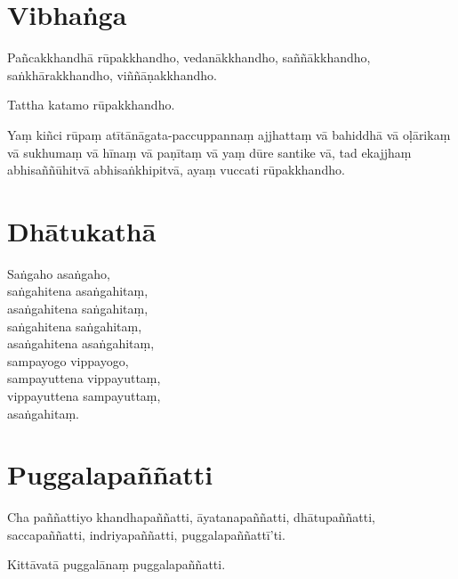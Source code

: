 


\section{Vibhaṅga}

Pañcakkhandhā rūpakkhandho, vedanākkhandho, saññākkhandho, saṅkhārakkhandho,
viññāṇakkhandho.

Tattha katamo rūpakkhandho.

Yaṃ kiñci rūpaṃ atītānāgata-paccuppannaṃ ajjhattaṃ vā bahiddhā vā oḷārikaṃ vā
sukhumaṃ vā hīnaṃ vā paṇītaṃ vā yaṃ dūre santike vā, tad ekajjhaṃ
abhisaññūhitvā abhisaṅkhipitvā, ayaṃ vuccati rūpakkhandho.



\section{Dhātukathā}

Saṅgaho asaṅgaho,\\
saṅgahitena asaṅgahitaṃ,\\
asaṅgahitena saṅgahitaṃ,\\
saṅgahitena saṅgahitaṃ,\\
asaṅgahitena asaṅgahitaṃ,\\
sampayogo vippayogo,\\
sampayuttena vippayuttaṃ,\\
vippayuttena sampayuttaṃ,\\
asaṅgahitaṃ.



\section{Puggalapaññatti}

Cha paññattiyo khandhapaññatti, āyatanapaññatti, dhātupaññatti, saccapaññatti,
indriyapaññatti, puggalapaññattī'ti.

Kittāvatā puggalānaṃ puggalapaññatti.

